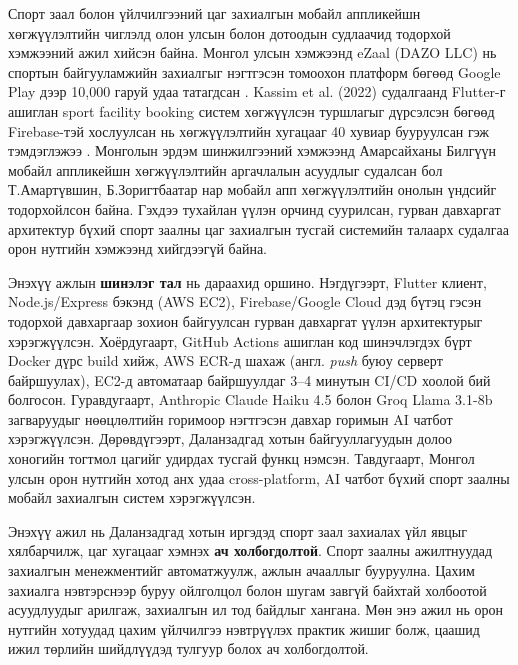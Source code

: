 Спорт заал болон үйлчилгээний цаг захиалгын мобайл аппликейшн хөгжүүлэлтийн чиглэлд олон улсын болон дотоодын судлаачид тодорхой хэмжээний ажил хийсэн байна. Монгол улсын хэмжээнд eZaal (DAZO LLC) нь спортын байгууламжийн захиалгыг нэгтгэсэн томоохон платформ бөгөөд Google Play дээр 10,000 гаруй удаа татагдсан \cite{ezaal_app}. Kassim et al. (2022) судалгаанд Flutter-г ашиглан sport facility booking систем хөгжүүлсэн туршлагыг дүрсэлсэн бөгөөд Firebase-тэй хослуулсан нь хөгжүүлэлтийн хугацааг 40 хувиар бууруулсан гэж тэмдэглэжээ \cite{flutter_booking}. Монголын эрдэм шинжилгээний хэмжээнд Амарсайханы Билгүүн \cite{thesis_mobile} мобайл аппликейшн хөгжүүлэлтийн аргачлалын асуудлыг судалсан бол Т.Амартүвшин, Б.Зоригтбаатар нар \cite{mobile_mongol} мобайл апп хөгжүүлэлтийн онолын үндсийг тодорхойлсон байна. Гэхдээ тухайлан үүлэн орчинд суурилсан, гурван давхаргат архитектур бүхий спорт заалны цаг захиалгын тусгай системийн талаарх судалгаа орон нутгийн хэмжээнд хийгдээгүй байна.

Энэхүү ажлын \textbf{шинэлэг тал} нь дараахид оршино. Нэгдүгээрт, Flutter клиент, Node.js/Express бэкэнд (AWS EC2), Firebase/Google Cloud дэд бүтэц гэсэн тодорхой давхаргаар зохион байгуулсан гурван давхаргат үүлэн архитектурыг хэрэгжүүлсэн. Хоёрдугаарт, GitHub Actions ашиглан код шинэчлэгдэх бүрт Docker дүрс build хийж, AWS ECR-д шахаж (англ. \textit{push} буюу серверт байршуулах), EC2-д автоматаар байршуулдаг 3--4 минутын CI/CD хоолой бий болгосон. Гуравдугаарт, Anthropic Claude Haiku 4.5 болон Groq Llama 3.1-8b загваруудыг нөөцлөлтийн горимоор нэгтгэсэн давхар горимын AI чатбот хэрэгжүүлсэн. Дөрөвдүгээрт, Даланзадгад хотын байгууллагуудын долоо хоногийн тогтмол цагийг удирдах тусгай  функц нэмсэн. Тавдугаарт, Монгол улсын орон нутгийн хотод анх удаа cross-platform, AI чатбот бүхий спорт заалны мобайл захиалгын систем хэрэгжүүлсэн.

Энэхүү ажил нь Даланзадгад хотын иргэдэд спорт заал захиалах үйл явцыг хялбарчилж, цаг хугацааг хэмнэх \textbf{ач холбогдолтой}. Спорт заалны ажилтнуудад захиалгын менежментийг автоматжуулж, ажлын ачааллыг бууруулна. Цахим захиалга нэвтэрснээр буруу ойлголцол болон шугам завгүй байхтай холбоотой асуудлуудыг арилгаж, захиалгын ил тод байдлыг хангана. Мөн энэ ажил нь орон нутгийн хотуудад цахим үйлчилгээ нэвтрүүлэх практик жишиг болж, цаашид ижил төрлийн шийдлүүдэд тулгуур болох ач холбогдолтой.


